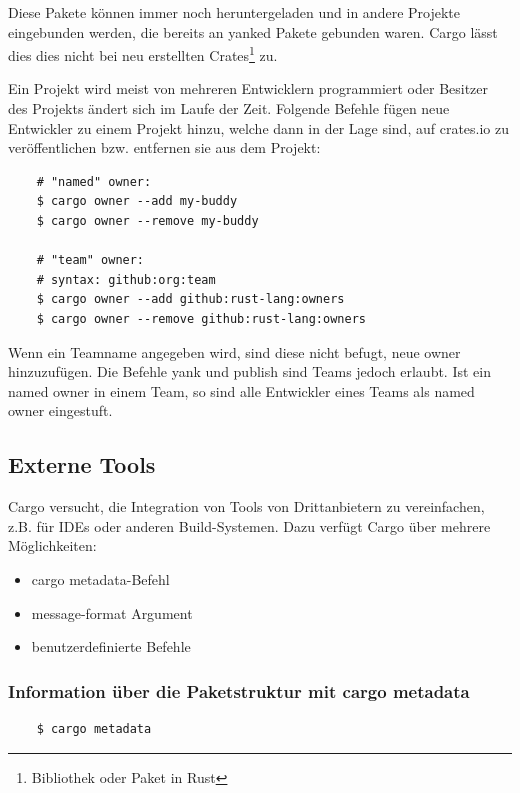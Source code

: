 Diese Pakete können immer noch heruntergeladen und in andere Projekte eingebunden werden, die bereits an \glqq yanked\grqq{} Pakete gebunden waren. Cargo lässt dies dies nicht bei neu erstellten Crates\footnote{Bibliothek oder Paket in Rust} zu.

Ein Projekt wird meist von mehreren Entwicklern programmiert oder Besitzer des Projekts ändert sich im Laufe der Zeit. Folgende Befehle fügen neue Entwickler zu einem Projekt hinzu, welche dann in der Lage sind, auf crates.io zu veröffentlichen bzw. entfernen sie aus dem Projekt:

\begin{lstlisting}
    # "named" owner:
    $ cargo owner --add my-buddy
    $ cargo owner --remove my-buddy

    # "team" owner:
    # syntax: github:org:team
    $ cargo owner --add github:rust-lang:owners
    $ cargo owner --remove github:rust-lang:owners
\end{lstlisting}

Wenn ein Teamname angegeben wird, sind diese nicht befugt, neue \glqq owner\grqq{} hinzuzufügen. Die Befehle yank und publish sind Teams jedoch erlaubt. Ist ein \glqq named owner\grqq{} in einem Team, so sind alle Entwickler eines Teams als \glqq named owner\grqq{} eingestuft.

\subsection{Externe Tools}

Cargo versucht, die Integration von Tools von Drittanbietern zu vereinfachen, z.B. für IDEs oder anderen Build-Systemen. Dazu verfügt Cargo über mehrere Möglichkeiten:

\begin{itemize}
    \item cargo metadata-Befehl
    \item message-format Argument
    \item benutzerdefinierte Befehle
\end{itemize}

\subsubsection{Information über die Paketstruktur mit cargo metadata}

\begin{lstlisting}
    $ cargo metadata
\end{lstlisting}

